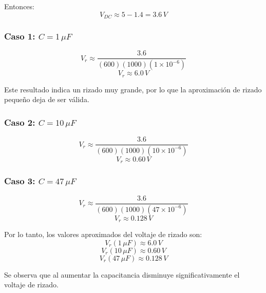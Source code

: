 \documentclass[12pt,a4paper]{article}
\begin{document}
Entonces:
\begin{equation}
V_{DC}\approx 5-1.4=3.6\,V
\end{equation}

\subsubsection*{Caso 1: $C=1\,\mu F$}

\begin{equation}
V_r\approx\frac{3.6}{(600)(1000)(1\times10^{-6})}
\end{equation}
\begin{equation}
V_r\approx 6.0\,V
\end{equation}

Este resultado indica un rizado muy grande, por lo que la aproximación de rizado pequeño deja de ser válida.

\subsubsection*{Caso 2: $C=10\,\mu F$}

\begin{equation}
V_r\approx\frac{3.6}{(600)(1000)(10\times10^{-6})}
\end{equation}
\begin{equation}
V_r\approx0.60\,V
\end{equation}

\subsubsection*{Caso 3: $C=47\,\mu F$}

\begin{equation}
V_r\approx\frac{3.6}{(600)(1000)(47\times10^{-6})}
\end{equation}
\begin{equation}
V_r\approx0.128\,V
\end{equation}

Por lo tanto, los valores aproximados del voltaje de rizado son:
\begin{equation}
V_r(1\,\mu F)\approx6.0\,V
\end{equation}
\begin{equation}
V_r(10\,\mu F)\approx0.60\,V
\end{equation}
\begin{equation}
V_r(47\,\mu F)\approx0.128\,V
\end{equation}

Se observa que al aumentar la capacitancia disminuye significativamente el voltaje de rizado.
\end{document}
